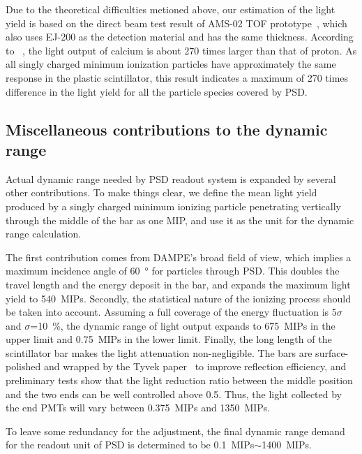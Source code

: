 \documentclass[5p, times]{elsarticle}
\begin{document}
Due to the theoretical difficulties metioned above, our estimation of the light yield is based on the direct beam test result of AMS-02 TOF prototype~\cite{bindi2005performance}, which also uses EJ-200 as the detection material and has the same thickness.
According to ~\cite{bindi2005performance}, the light output of calcium is about 270 times larger than that of proton.
As all singly charged minimum ionization particles have approximately the same response in the plastic scintillator, this result indicates a maximum of 270 times difference in the light yield for all the particle species covered by PSD.

\subsection{Miscellaneous contributions to the dynamic range}
\label{sec:misc_contributions}
Actual dynamic range needed by PSD readout system is expanded by several other contributions. 
To make things clear, we define the mean light yield produced by a singly charged minimum ionizing particle penetrating vertically through the middle of the bar as one MIP, and use it as the unit for the dynamic range calculation.

The first contribution comes from DAMPE's broad field of view, which implies a maximum incidence angle of \SI{60}{\degree} for particles through PSD.
This doubles the travel length and the energy deposit in the bar, and expands the maximum light yield to \SI{540}{MIPs}.  
Secondly, the statistical nature of the ionizing process should be taken into account.
Assuming a full coverage of the energy fluctuation is 5$\sigma$ and $\sigma$=\SI{10}{\percent}, the dynamic range of light output expands to \SI{675}{MIPs} in the upper limit and \SI{0.75}{MIPs} in the lower limit. 
Finally, the long length of the scintillator bar makes the light attenuation non-negligible.
The bars are surface-polished and wrapped by the Tyvek paper~\cite{tyvek} to improve reflection efficiency, and preliminary tests show that the light reduction ratio between the middle position and the two ends can be well controlled above 0.5.
Thus, the light collected by the end PMTs will vary between \SI{0.375}{MIPs} and \SI{1350}{MIPs}.

To leave some redundancy for the adjustment, the final dynamic range demand for the readout unit of PSD is determined to be \SI{0.1}{MIPs}$\sim$\SI{1400}{MIPs}.
\end{document}
